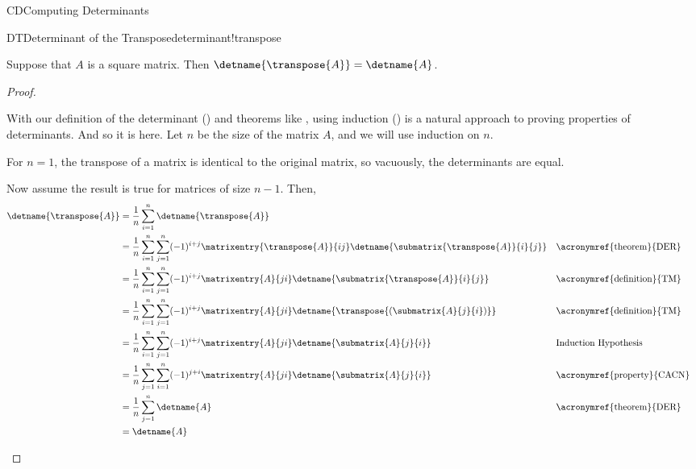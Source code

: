 \begin{subsect}{CD}{Computing Determinants}
%
\begin{theorem}{DT}{Determinant of the Transpose}{determinant!transpose}
\begin{para}Suppose that $A$ is a square matrix.  Then $\detname{\transpose{A}}=\detname{A}$.\end{para}
\end{theorem}
%
\begin{proof}
%
\begin{para}With our definition of the determinant () and theorems like , using induction () is a natural approach to proving properties of determinants.  And so it is here.  Let $n$ be the size of the matrix $A$, and we will use induction on $n$.\end{para}
%
\begin{para}For $n=1$, the transpose of a matrix is identical to the original matrix, so vacuously, the determinants are equal.\end{para}
%
\begin{para}Now assume the result is true for matrices of size $n-1$.  Then,
%
\begin{align*}
\detname{\transpose{A}}
&=\frac{1}{n}\sum_{i=1}^{n}\detname{\transpose{A}}\\
%
&=
\frac{1}{n}\sum_{i=1}^{n}\sum_{j=1}^{n}(-1)^{i+j}
\matrixentry{\transpose{A}}{ij}\detname{\submatrix{\transpose{A}}{i}{j}}
&&\text{\acronymref{theorem}{DER}}\\
%
&=
\frac{1}{n}\sum_{i=1}^{n}\sum_{j=1}^{n}(-1)^{i+j}
\matrixentry{A}{ji}\detname{\submatrix{\transpose{A}}{i}{j}}
&&\text{\acronymref{definition}{TM}}\\
%
&=
\frac{1}{n}\sum_{i=1}^{n}\sum_{j=1}^{n}(-1)^{i+j}
\matrixentry{A}{ji}\detname{\transpose{\left(\submatrix{A}{j}{i}\right)}}
&&\text{\acronymref{definition}{TM}}\\
%
&=
\frac{1}{n}\sum_{i=1}^{n}\sum_{j=1}^{n}(-1)^{i+j}
\matrixentry{A}{ji}\detname{\submatrix{A}{j}{i}}
&&\text{Induction Hypothesis}\\
%
&=
\frac{1}{n}\sum_{j=1}^{n}\sum_{i=1}^{n}(-1)^{j+i}
\matrixentry{A}{ji}\detname{\submatrix{A}{j}{i}}
&&\text{\acronymref{property}{CACN}}\\
%
&=
\frac{1}{n}\sum_{j=1}^{n}\detname{A}
&&\text{\acronymref{theorem}{DER}}\\
%
&=\detname{A}
%
\end{align*}
\end{para}
%
\end{proof}

\end{subsect}
